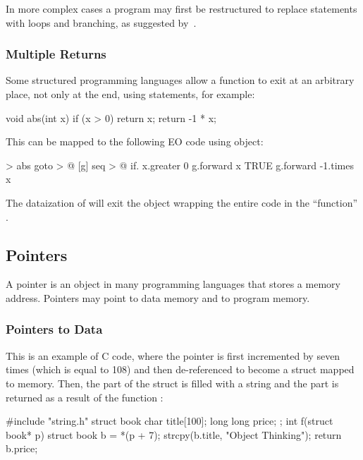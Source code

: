 \documentclass[sigplan,11pt,nonacm,natbib=false]{acmart}
\begin{document}
In more complex cases a program may first be restructured to replace  statements with loops and branching, as suggested by~\citet{williams1985restructuring,pan1996formal,erosa1994taming,ceccato2008goto}.

\subsubsection{Multiple Returns}

Some structured programming languages allow a function to exit at an arbitrary place, not only at the end, using  statements, for example:

\begin{ffcode}
void abs(int x) {
  if (x > 0) {
    return x;
  }
  return -1 * x;
}
\end{ffcode}

This can be mapped to the following EO code using  object:

\begin{ffcode}
[x] > abs
  goto > @
    [g]
      seq > @
        if.
          x.greater 0
          g.forward x
          TRUE
        g.forward
          -1.times x
\end{ffcode}

The dataization of  will exit the  object wrapping the entire code in the ``function'' .

\subsection{Pointers}
\label{sec:pointers}

A pointer is an object in many programming languages that stores a memory address. Pointers may point to data memory and to program memory.

\subsubsection{Pointers to Data}

This is an example of C code, where the pointer  is first incremented by seven times  (which is equal to 108) and then de-referenced to become a struct  mapped to memory. Then, the  part of the struct is filled with a string and the  part is returned as a result of the function :

\begin{ffcode}
#include "string.h"
struct book { 
  char title[100]; 
  long long price; 
};
int f(struct book* p) {
  struct book b = *(p + 7);
  strcpy(b.title, "Object Thinking");
  return b.price;
}
\end{ffcode}
\end{document}
